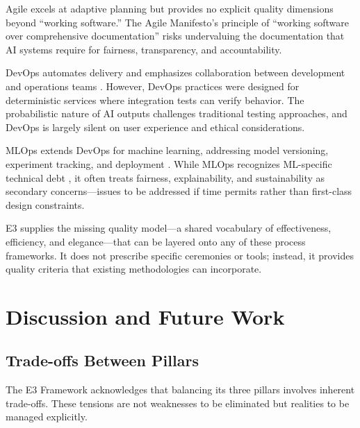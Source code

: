 \documentclass[11pt,a4paper]{article}
\begin{document}
Agile excels at adaptive planning but provides no explicit quality dimensions beyond ``working software.'' The Agile Manifesto's principle of ``working software over comprehensive documentation'' \cite{beck2000extreme} risks undervaluing the documentation that AI systems require for fairness, transparency, and accountability.

DevOps automates delivery and emphasizes collaboration between development and operations teams \cite{humble2010continuous}. However, DevOps practices were designed for deterministic services where integration tests can verify behavior. The probabilistic nature of AI outputs challenges traditional testing approaches, and DevOps is largely silent on user experience and ethical considerations.

MLOps extends DevOps for machine learning, addressing model versioning, experiment tracking, and deployment \cite{sridhar2022mlops}. While MLOps recognizes ML-specific technical debt \cite{sculley2015hidden}, it often treats fairness, explainability, and sustainability as secondary concerns---issues to be addressed if time permits rather than first-class design constraints.

E3 supplies the missing quality model---a shared vocabulary of effectiveness, efficiency, and elegance---that can be layered onto any of these process frameworks. It does not prescribe specific ceremonies or tools; instead, it provides quality criteria that existing methodologies can incorporate.




\section{Discussion and Future Work}

\subsection{Trade-offs Between Pillars}

The E3 Framework acknowledges that balancing its three pillars involves inherent trade-offs. These tensions are not weaknesses to be eliminated but realities to be managed explicitly.
\end{document}
